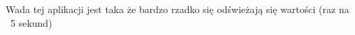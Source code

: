 \documentclass[a4paper,12pt]{extarticle}  %
\begin{document}
	
	\begin{figure}[H]
		\centering
		\end{figure}

		\begin{figure}[H]
		   \centering
		\end{figure}

Wada tej aplikacji jest taka że bardzo rzadko się odświeżają się wartości (raz na ~5 sekund)
\end{document}
